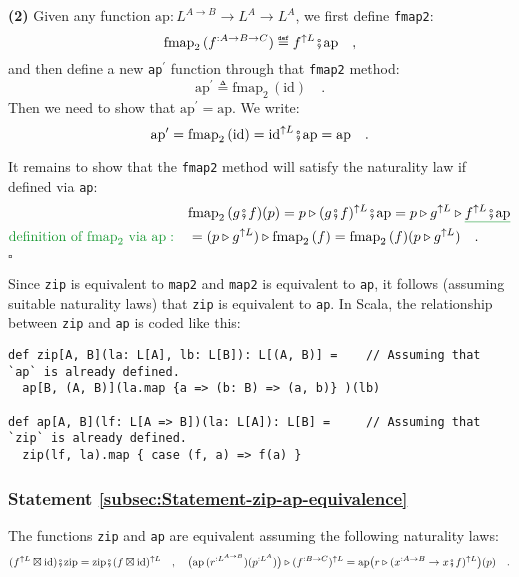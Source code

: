 \textbf{(2)} Given any function $\text{ap}:L^{A\rightarrow B}\rightarrow L^{A}\rightarrow L^{A}$,
we first define \lstinline!fmap2!:
\[
\text{fmap}_{2}\,(f^{:A\rightarrow B\rightarrow C})\triangleq f^{\uparrow L}\bef\text{ap}\quad,
\]
and then define a new \lstinline!ap!$^{\prime}$ function through
that \lstinline!fmap2! method:
\[
\text{ap}^{\prime}\triangleq\text{fmap}_{2}\,(\text{id})\quad.
\]
Then we need to show that $\text{ap}^{\prime}=\text{ap}$. We write:
\[
\text{ap}^{\prime}=\text{fmap}_{2}\,(\text{id})=\text{id}^{\uparrow L}\bef\text{ap}=\text{ap}\quad.
\]

It remains to show that the \lstinline!fmap2! method will satisfy
the naturality law if defined via \lstinline!ap!:
\begin{align*}
 & \text{fmap}_{2}\,(g\bef f)(p)=p\triangleright(g\bef f)^{\uparrow L}\bef\text{ap}=p\triangleright g^{\uparrow L}\triangleright\gunderline{f^{\uparrow L}\bef\text{ap}}\\
{\color{greenunder}\text{definition of }\text{fmap}_{2}\text{ via }\text{ap}:}\quad & =(p\triangleright g^{\uparrow L})\triangleright\text{fmap}_{2}\,(f)=\text{fmap}_{2}\,(f)(p\triangleright g^{\uparrow L})\quad.
\end{align*}
$\square$

Since \lstinline!zip! is equivalent to \lstinline!map2! and \lstinline!map2!
is equivalent to \lstinline!ap!, it follows (assuming suitable naturality
laws) that \lstinline!zip! is equivalent to \lstinline!ap!. In Scala,
the relationship between \lstinline!zip! and \lstinline!ap! is coded
like this:
\begin{lstlisting}
def zip[A, B](la: L[A], lb: L[B]): L[(A, B)] =    // Assuming that `ap` is already defined.
  ap[B, (A, B)](la.map {a => (b: B) => (a, b)} )(lb)

def ap[A, B](lf: L[A => B])(la: L[A]): L[B] =     // Assuming that `zip` is already defined.
  zip(lf, la).map { case (f, a) => f(a) }
\end{lstlisting}


\subsubsection{Statement \label{subsec:Statement-zip-ap-equivalence}\ref{subsec:Statement-zip-ap-equivalence}}

The functions \lstinline!zip! and \lstinline!ap! are equivalent
assuming the following naturality laws:
\[
(f^{\uparrow L}\boxtimes\text{id})\bef\text{zip}=\text{zip}\bef(f\boxtimes\text{id})^{\uparrow L}\quad,\quad\big(\text{ap}\,(r^{:L^{A\rightarrow B}})(p^{:L^{A}})\big)\triangleright(f^{:B\rightarrow C})^{\uparrow L}=\text{ap}\big(r\triangleright(x^{:A\rightarrow B}\rightarrow x\bef f)^{\uparrow L}\big)(p)\quad.
\]



